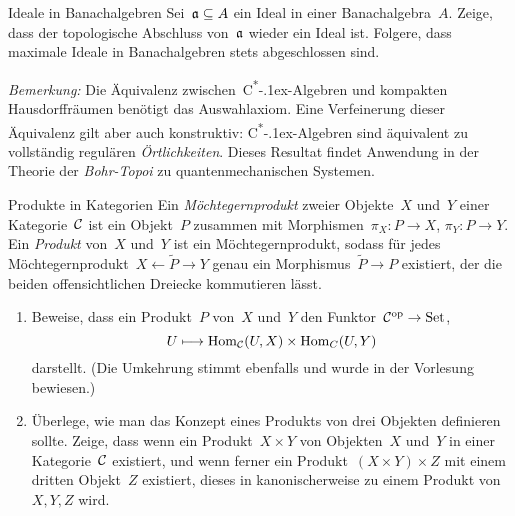 \documentclass{uebblatt}
\begin{document}
\begin{aufgabe}{Ideale in Banachalgebren}
Sei~$\mathfrak{a} \subseteq A$ ein Ideal in einer Banachalgebra~$A$. Zeige, dass der
topologische Abschluss von~$\mathfrak{a}$ wieder ein Ideal ist. Folgere, dass maximale
Ideale in Banachalgebren stets abgeschlossen sind.

\emph{Bemerkung:} Die Äquivalenz
zwischen~C\textsuperscript{*}\kern-.1ex-Alge\-bren und kompakten
Hausdorffräumen benötigt das Auswahlaxiom. Eine Verfeinerung dieser Äquivalenz
gilt aber auch konstruktiv: C\textsuperscript{*}\kern-.1ex-Alge\-bren sind
äquivalent zu vollständig regulären \emph{Örtlichkeiten}. Dieses Resultat
findet Anwendung in der Theorie der \emph{Bohr-Topoi} zu
quantenmechanischen Systemen.
\end{aufgabe}

\begin{aufgabe}{Produkte in Kategorien}
Ein \emph{Möchtegernprodukt} zweier Objekte~$X$ und~$Y$ einer Kategorie~$\mathcal{C}$ ist ein
Objekt~$P$ zusammen mit Morphismen~$\pi_X : P \to X$, $\pi_Y : P \to Y$. Ein
\emph{Produkt} von~$X$ und~$Y$ ist ein Möchtegernprodukt, sodass für jedes
Möchtegernprodukt~$X \leftarrow \widetilde P \to Y$ genau ein Morphismus~$\widetilde
P \to P$ existiert, der die beiden offensichtlichen Dreiecke kommutieren lässt.
\begin{enumerate}
\item Beweise, dass ein Produkt~$P$ von~$X$ und~$Y$ den Funktor~$\mathcal{C}^{\mathrm{op}} \to
\mathrm{Set}$,
\[ U \longmapsto \mathrm{Hom}_{\mathcal{C}}(U,X) \times \mathrm{Hom}_C(U,Y) \]
darstellt. (Die Umkehrung stimmt ebenfalls und wurde in der Vorlesung bewiesen.)

\item Überlege, wie man das Konzept eines Produkts von drei Objekten definieren
sollte. Zeige, dass wenn ein Produkt~$X \times Y$ von Objekten~$X$ und~$Y$
in einer Kategorie~$\mathcal{C}$ existiert, und wenn ferner ein Produkt~$(X \times Y)
\times Z$ mit einem dritten Objekt~$Z$ existiert, dieses in kanonischerweise zu
einem Produkt von~$X,Y,Z$ wird.
\end{enumerate}
\end{aufgabe}
\end{document}
